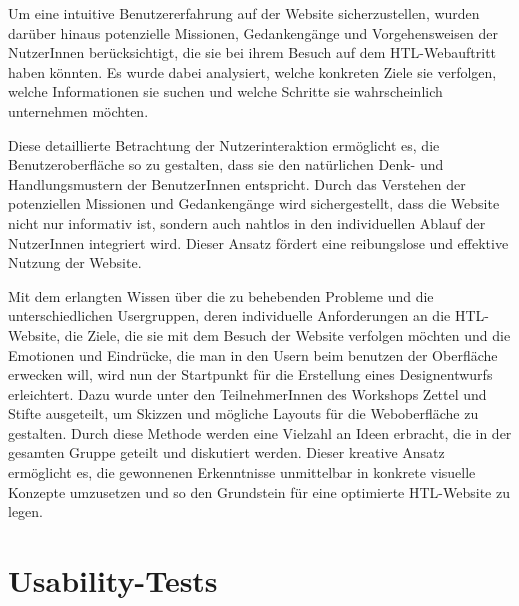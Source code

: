 Um eine intuitive Benutzererfahrung auf der Website sicherzustellen, wurden darüber hinaus potenzielle Missionen, 
Gedankengänge und Vorgehensweisen der NutzerInnen berücksichtigt, die sie bei ihrem Besuch auf dem HTL-Webauftritt haben könnten. 
Es wurde dabei analysiert, welche konkreten Ziele sie verfolgen, welche Informationen sie suchen und welche Schritte sie wahrscheinlich unternehmen möchten.

Diese detaillierte Betrachtung der Nutzerinteraktion ermöglicht es, die Benutzeroberfläche so zu gestalten, dass sie den natürlichen Denk- und Handlungsmustern 
der BenutzerInnen entspricht. Durch das Verstehen der potenziellen Missionen und Gedankengänge wird sichergestellt, dass die Website nicht nur informativ ist, 
sondern auch nahtlos in den individuellen Ablauf der NutzerInnen integriert wird. Dieser Ansatz fördert eine reibungslose und effektive Nutzung der Website.

Mit dem erlangten Wissen über die zu behebenden Probleme und die unterschiedlichen Usergruppen, deren individuelle Anforderungen 
an die HTL-Website, die Ziele, die sie mit dem Besuch der Website verfolgen möchten und die Emotionen und Eindrücke, die man in den Usern beim benutzen der Oberfläche erwecken will,
wird nun der Startpunkt für die Erstellung eines Designentwurfs erleichtert. Dazu wurde unter den
TeilnehmerInnen des Workshops Zettel und Stifte ausgeteilt, um Skizzen und mögliche Layouts für die Weboberfläche zu gestalten. 
Durch diese Methode werden eine Vielzahl an Ideen erbracht, die in der gesamten Gruppe geteilt und diskutiert werden. 
Dieser kreative Ansatz ermöglicht es, die gewonnenen Erkenntnisse 
unmittelbar in konkrete visuelle Konzepte umzusetzen und so den Grundstein für eine optimierte HTL-Website zu legen.


\section{Usability-Tests}

